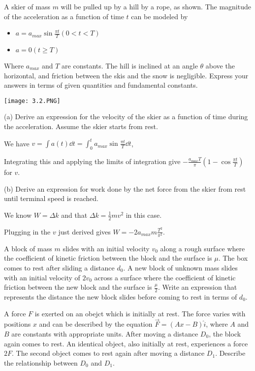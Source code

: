 \documentclass[../mech.tex]{subfiles}
\begin{document}
\begin{example}
    A skier of mass $m$ will be pulled up by a hill by a rope, as shown. The magnitude of the acceleration as a function of time $t$ can be modeled by 
    \begin{itemize}
        \item $a=a_{max}\sin \frac{\pi t}{T} (0<t<T)$
        \item $a=0 (t\geq T)$
    \end{itemize}

    Where $a_{max}$ and $T$ are constants. The hill is inclined at an angle $\theta$ above the horizontal, and friction between the skis and the snow is negligible. Express your answers in terms of given quantities and fundamental constants.
    
    \begin{center}
        \texttt{[image: 3.2.PNG]}
    \end{center}

    (a) Derive an expression for the velocity of the skier as a function of time during the acceleration. Assume the skier starts from rest.

    We have $v=\int a(t)\dd t = \int_0^t a_{max}\sin \frac{\pi t}{T} \dd t$,

    Integrating this and applying the limits of integration give $-\frac{a_{max}T}{\pi}\left(1-\cos\frac{\pi t}{T}\right)$ for $v$.
    \medbreak

    (b) Derive an expression for work done by the net force from the skier from rest until terminal speed is reached.

    We know $W=\Delta k$ and that $\Delta k = \frac{1}{2}mv^2$ in this case.

    Plugging in the $v$ just derived gives $W=-2a_{max}m\frac{T^2}{\pi^2}$.
\end{example}
\ex A block of mass $m$ slides with an initial velocity $v_0$ along a rough surface where the coefficient of kinetic friction between the block and the surface is $\mu$. The box comes to rest 
after sliding a distance $d_0$. A new block of unknown mass slides with an initial velocity of $2v_0$ across a surface where the coefficient of kinetic friction between the new block and the surface is $\frac{\mu}{2}$.
Write an expression that represents the distance the new block slides before coming to rest in terms of $d_0$.

\ex A force $F$ is exerted on an obejct which is initially at rest. The force varies with positions $x$ and can be described by the equation $\vec{F}=(Ax-B)\hat{i}$, where $A$ and $B$ are constants with appropriate units.
After moving a distance $D_0$, the block again comes to rest. An identical object, also initially at rest, experiences a force $2F$. The second object comes to rest again after moving a distance $D_1$. Describe the relationship between $D_0$ and $D_1$.
\end{document}
